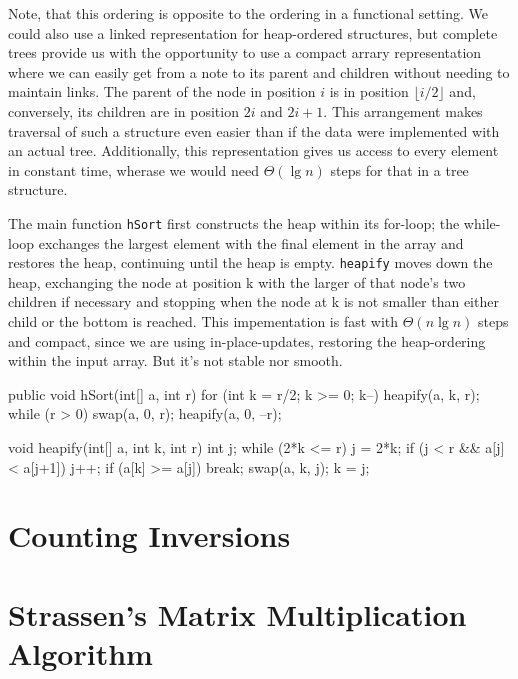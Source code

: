 Note, that this ordering is opposite to the ordering in a functional setting.
We could also use a linked representation for heap-ordered structures, but complete trees provide us with the opportunity to use a compact arrary representation where we can easily get from a note to its parent and children without needing to maintain links.
The parent of the node in position $i$ is in position $\lfloor i/2 \rfloor$ and, conversely, its children are in position $2i$ and $2i+1$.
This arrangement makes traversal of such a structure even easier than if the data were implemented with an actual tree.
Additionally, this representation gives us access to every element in constant time, wherase we would need $\Theta(\lg n)$ steps for that in a tree structure.

\begin{impl}
The main function \texttt{hSort} first constructs the heap within its for-loop; the while-loop exchanges the largest element with the final element in the array and restores the heap, continuing until the heap is empty.
\texttt{heapify} moves down the heap, exchanging the node at position k with the larger of that node's two children if necessary and stopping when the node at k is not smaller than either child or the bottom is reached.
This impementation is fast with $\Theta(n \lg n)$ steps and compact, since we are using in-place-updates, restoring the heap-ordering within the input array. But it's not stable nor smooth.
\end{impl}

\begin{javacode}
public void hSort(int[] a, int r) {
    for (int k = r/2; k >= 0; k--)
        heapify(a, k, r);
    while (r > 0) {
        swap(a, 0, r);
        heapify(a, 0, --r);
    }
}

void heapify(int[] a, int k, int r) {
    int j;
    while (2*k <= r) {
        j = 2*k;
        if (j < r && a[j] < a[j+1]) j++;
        if (a[k] >= a[j]) break;
        swap(a, k, j);
        k = j;
    }
}
\end{javacode}


\section{Counting Inversions}

\section{Strassen's Matrix Multiplication Algorithm}

